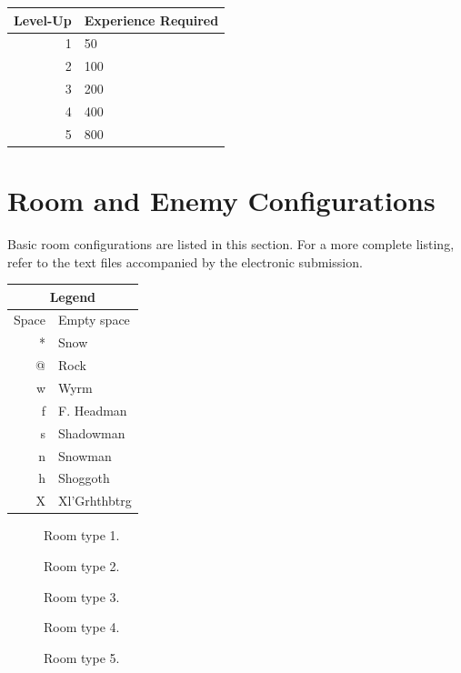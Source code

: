 \documentclass{article}
\begin{document}
\begin{tabular}{|r|l|}
\hline
Level-Up&Experience Required\\
\hline
1&50\\
2&100\\
3&200\\
4&400\\
5&800\\
\hline
\end{tabular}

\label{RoomAndEnemy}
\section{Room and Enemy Configurations}

Basic room configurations are listed in this section.  For a more complete listing, refer to the text files accompanied by the electronic submission.

\begin{tabular}{|r|l|}
\hline
\multicolumn{2}{|c|}{Legend} \\
\hline
Space & Empty space \\
* & Snow \\
@ & Rock \\
w & Wyrm \\
f & F. Headman \\
s & Shadowman \\
n & Snowman \\
h & Shoggoth \\
X & Xl'Grhthbtrg \\
\hline

\end{tabular}

\begin{figure}[htbp]
	
	\caption{Room type 1.}
	\label{Type1}
\end{figure}

\begin{figure}[htbp]
	
	\caption{Room type 2.}
	\label{Type2}
\end{figure}

\begin{figure}[htbp]
	
	\caption{Room type 3.}
	\label{Type3}
\end{figure}

\begin{figure}[htbp]
	
	\caption{Room type 4.}
	\label{Type4}
\end{figure}

\begin{figure}[htbp]
	
	\caption{Room type 5.}
	\label{Type5}
\end{figure}
\end{document}
